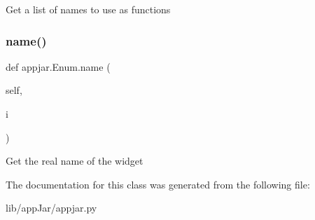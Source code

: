 \begin{DoxyVerb}Get a list of names to use as functions \end{DoxyVerb}
 \mbox{\label{classappjar_1_1_enum_a9b6e97ebe09d5b42613fcb70faddadfa}} 
\subsubsection{\texorpdfstring{name()}{name()}}
{\footnotesize\ttfamily def appjar.\+Enum.\+name (\begin{DoxyParamCaption}\item[{}]{self,  }\item[{}]{i }\end{DoxyParamCaption})}

\begin{DoxyVerb}Get the real name of the widget\end{DoxyVerb}
 

The documentation for this class was generated from the following file\+:\begin{DoxyCompactItemize}
\item 
lib/app\+Jar/appjar.\+py\end{DoxyCompactItemize}
